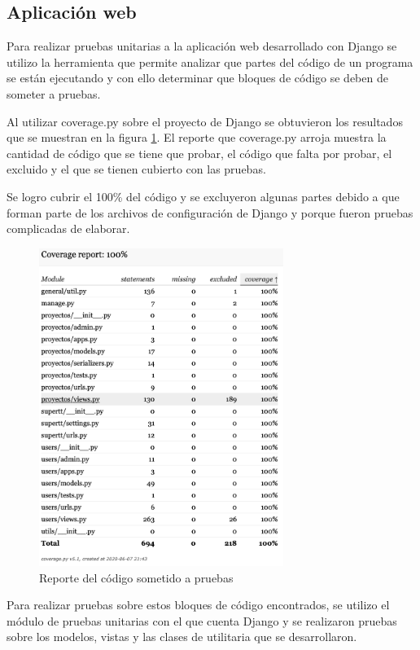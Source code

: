 \subsection{Aplicación web}

Para realizar pruebas unitarias a la aplicación web desarrollado con Django se utilizo la herramienta que permite analizar que partes del código de un programa se están ejecutando y con ello determinar que bloques de código se deben de someter a pruebas.

Al utilizar coverage.py sobre el proyecto de Django se obtuvieron los resultados que se muestran en la figura \ref{fig:coverage}. El reporte que coverage.py arroja muestra la cantidad de código que se tiene que probar, el código que falta por probar, el excluido y el que se tienen cubierto con las pruebas.

Se logro cubrir el 100\% del código y se excluyeron algunas partes debido a que forman parte de los archivos de configuración de Django y porque fueron pruebas complicadas de elaborar.

\begin{figure}[H]
	\centering
	\includegraphics[width=300px]{capitulo6/unitarias/img/coverage.png}
	\caption{Reporte del código sometido a pruebas}
	\label{fig:coverage}
\end{figure}

Para realizar pruebas sobre estos bloques de código encontrados, se utilizo el módulo de pruebas unitarias con el que cuenta Django y se realizaron pruebas sobre los modelos, vistas y las clases de utilitaria que se desarrollaron.

